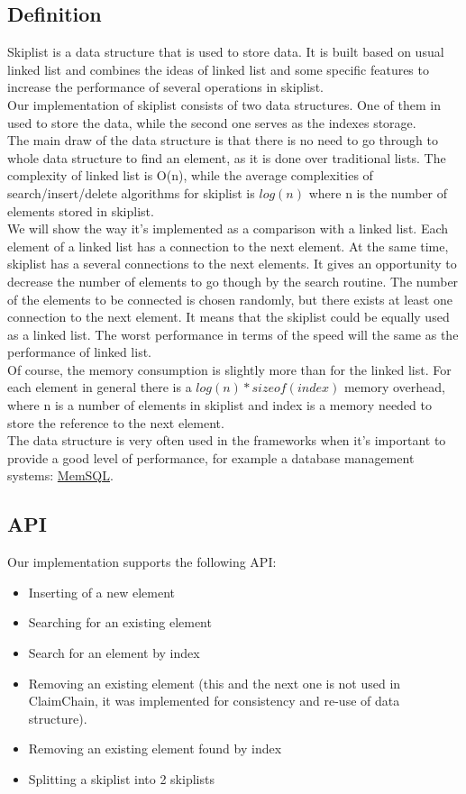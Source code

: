 \documentclass[a4paper]{article}
\begin{document}
\subsection{Definition}
Skiplist is a data structure that is used to store data. It is built based on usual linked list and combines the ideas of linked list and some specific features to increase the performance of several operations in skiplist. \\
Our implementation of skiplist consists of two data structures. One of them in used to store the data, while the second one serves as the indexes storage. \\ The main draw of the data structure is that there is no need to go through to whole data structure to find an element, as it is done over traditional lists. The complexity of linked list is O(n), while the average complexities of search/insert/delete algorithms for skiplist is $log(n)$ where n is the number of elements stored in skiplist. \\
We will show the way it's implemented as a comparison with a linked list. Each element of a linked list has a connection to the next element. At the same time, skiplist has a several connections to the next elements. It gives an opportunity to decrease the number of elements to go though by the search routine. The number of the elements to be connected is chosen randomly, but there exists at least one connection to the next element. It means that the skiplist could be equally used as a linked list. The worst performance in terms of the speed will the same as the performance of linked list.\\ Of course, the memory consumption is slightly more than for the linked list. For each element in general there is a $log(n) * sizeof(index)$ memory overhead, where n is a number of elements in skiplist and index is a memory needed to store the reference to the next element. \\
The data structure is very often used in the frameworks when it's important to provide a good level of performance, for example a database management systems: \hyperlink{https://en.wikipedia.org/wiki/MemSQL} {MemSQL}.
\subsection{API}
Our implementation supports the following API: \begin{itemize}
\item Inserting of a new element
\item Searching for an existing element
\item Search for an element by index
\item Removing an existing element (this and the next one is not used in ClaimChain, it was implemented for consistency and re-use of data structure). 
\item Removing an existing element found by index
\item Splitting a skiplist into 2 skiplists
\end{itemize}
\end{document}
